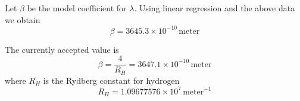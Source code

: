 \documentclass[12pt]{article}
\begin{document}
\noindent
Let $\beta$ be the model coefficient for $\lambda$.
Using linear regression and the above data we obtain
\begin{equation*}
\beta=3645.3\times10^{-10}\,\text{meter}
\end{equation*}

%
%
%
%
%

\noindent
The currently accepted value is
\begin{equation*}
\beta=\frac{4}{R_H}=3647.1\times10^{-10}\,\text{meter}
\end{equation*}
where $R_H$ is the Rydberg constant for hydrogen
\begin{equation*}
R_H=1.09677576\times10^7\,\text{meter}^{-1}
\end{equation*}
\end{document}
